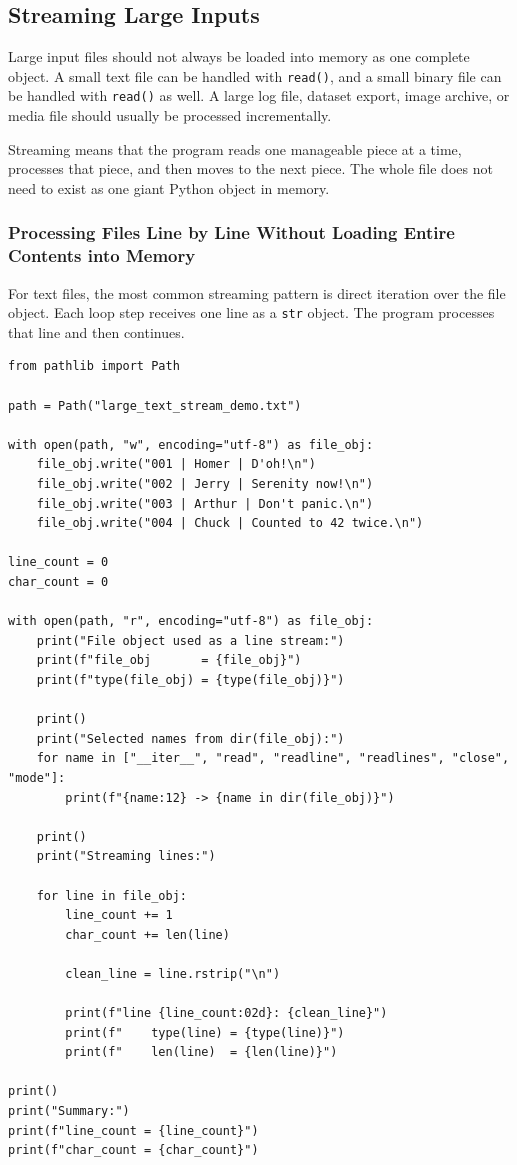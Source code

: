 \subsection{Streaming Large Inputs}

Large input files should not always be loaded into memory as one complete object. A small text file can be handled with \texttt{read()}, and a small binary file can be handled with \texttt{read()} as well. A large log file, dataset export, image archive, or media file should usually be processed incrementally.

Streaming means that the program reads one manageable piece at a time, processes that piece, and then moves to the next piece. The whole file does not need to exist as one giant Python object in memory.

\subsubsection{Processing Files Line by Line Without Loading Entire Contents into Memory}

For text files, the most common streaming pattern is direct iteration over the file object. Each loop step receives one line as a \texttt{str} object. The program processes that line and then continues.

\begin{verbatim}
from pathlib import Path

path = Path("large_text_stream_demo.txt")

with open(path, "w", encoding="utf-8") as file_obj:
    file_obj.write("001 | Homer | D'oh!\n")
    file_obj.write("002 | Jerry | Serenity now!\n")
    file_obj.write("003 | Arthur | Don't panic.\n")
    file_obj.write("004 | Chuck | Counted to 42 twice.\n")

line_count = 0
char_count = 0

with open(path, "r", encoding="utf-8") as file_obj:
    print("File object used as a line stream:")
    print(f"file_obj       = {file_obj}")
    print(f"type(file_obj) = {type(file_obj)}")

    print()
    print("Selected names from dir(file_obj):")
    for name in ["__iter__", "read", "readline", "readlines", "close", "mode"]:
        print(f"{name:12} -> {name in dir(file_obj)}")

    print()
    print("Streaming lines:")

    for line in file_obj:
        line_count += 1
        char_count += len(line)

        clean_line = line.rstrip("\n")

        print(f"line {line_count:02d}: {clean_line}")
        print(f"    type(line) = {type(line)}")
        print(f"    len(line)  = {len(line)}")

print()
print("Summary:")
print(f"line_count = {line_count}")
print(f"char_count = {char_count}")
\end{verbatim}

